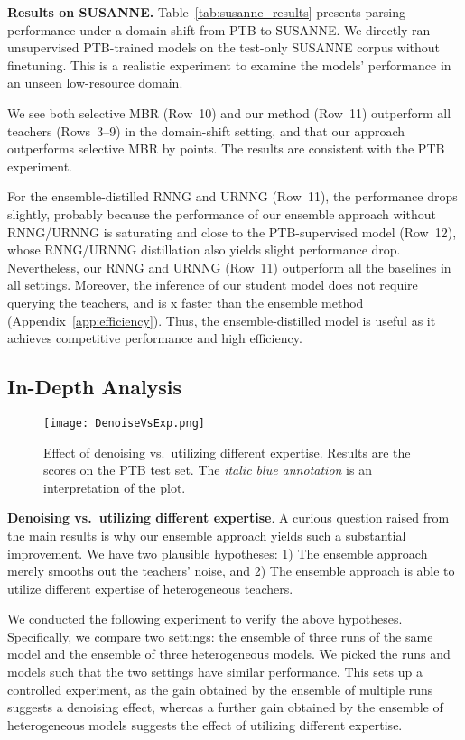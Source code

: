 \documentclass{article}
\begin{document}
\textbf{Results on SUSANNE.} Table~\ref{tab:susanne_results} presents parsing performance under a domain shift from PTB to SUSANNE. We directly ran unsupervised PTB-trained models on the test-only SUSANNE corpus without finetuning. This is a realistic experiment to examine the models' performance in an unseen low-resource domain.

We see both selective MBR (Row~10) and our method (Row~11) outperform all teachers (Rows~3--9) in the domain-shift setting, and that our approach outperforms selective MBR by  points. The results are consistent with the PTB experiment.

For the ensemble-distilled RNNG and URNNG (Row~11), the performance drops slightly, probably because the performance of our ensemble approach without RNNG/URNNG is saturating and close to the PTB-supervised model (Row~12), whose RNNG/URNNG distillation also yields slight performance drop.
Nevertheless, our RNNG and URNNG (Row~11) outperform all the baselines in all settings. Moreover, the inference of our student model does not require querying the teachers, and is x faster than the ensemble method (Appendix~\ref{app:efficiency}). Thus, the ensemble-distilled model is useful as it achieves competitive performance and high efficiency.

\subsection{In-Depth Analysis}
\label{ss:analysis}
\begin{figure}[!b]
\begin{center}
\texttt{[image: DenoiseVsExp.png]}
\end{center}\vspace{-10pt}
\caption{Effect of denoising vs.~utilizing different expertise. Results are the  scores on the PTB test set. The {\color{blue} \textit{italic blue annotation}} is an interpretation of the plot.}
\label{fig:denoisingvsexp}
\end{figure}

\textbf{Denoising vs.~utilizing different expertise}. A curious question raised from the main results is why our ensemble approach yields such a substantial improvement. We have two plausible hypotheses: 1) The ensemble approach merely smooths out the teachers' noise, and 2) The ensemble approach is able to utilize different expertise of heterogeneous teachers.

We conducted the following experiment to verify the above hypotheses. Specifically, we compare two settings: the ensemble of three runs of the same model and the ensemble of three heterogeneous models. We picked the runs and models such that the two settings have similar performance. This sets up a controlled experiment, as the gain obtained by the ensemble of multiple runs suggests a denoising effect, whereas a further gain obtained by the ensemble of heterogeneous models suggests the effect of utilizing different expertise.
\end{document}
